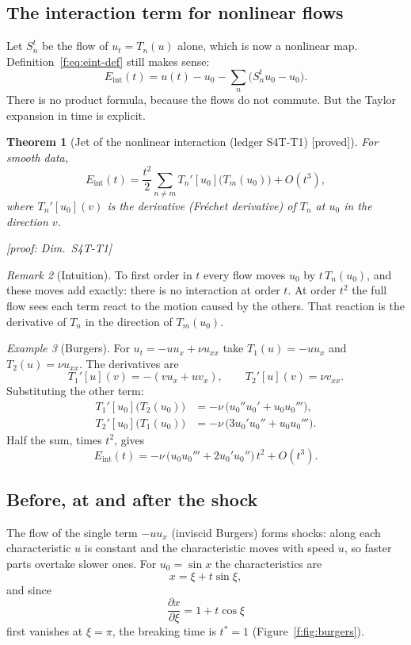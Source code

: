\documentclass[11pt]{article}
\theoremstyle{plain}
\newtheorem{theorem}{Theorem}[section]
\theoremstyle{definition}
\theoremstyle{remark}
\newtheorem{remark}[theorem]{Remark}
\newtheorem{example}[theorem]{Example}
\newcommand{\Eint}{E_{\mathrm{int}}}        %
\newcommand{\badge}[2]{\textcolor{#1}{\textsf{\footnotesize[#2]}}}
\newcommand{\proved}[1][]{\badge{cC}{proved#1}}
\newcommand{\led}[1]{\textcolor{cG}{\textsf{\footnotesize(ledger #1)}}}
\newenvironment{intuition}{\begin{remark}[Intuition]}{\end{remark}}
\newcommand{\dimref}[1]{\textsf{\footnotesize[proof: Dim.~#1]}}
\begin{document}
\subsection{The interaction term for nonlinear flows}

Let $S_n^t$ be the flow of $u_t=T_n(u)$ alone, which is now a nonlinear map. Definition~\eqref{f:eq:eint-def} still makes sense:
\[
\Eint(t)=u(t)-u_0-\sum_n\big(S_n^tu_0-u_0\big).
\]
There is no product formula, because the flows do not commute. But the Taylor expansion in time is explicit.

\begin{theorem}[{Jet of the nonlinear interaction \led{S4T-T1} \proved}]\label{f:thm:jet}
For smooth data,
\[
\Eint(t)=\frac{t^2}{2}\sum_{n\ne m}T_n'[u_0]\big(T_m(u_0)\big)+O(t^3),
\]
where $T_n'[u_0](v)$ is the derivative (Fr\'echet derivative) of $T_n$ at $u_0$ in the direction $v$.

\dimref{S4T-T1}
\end{theorem}

\begin{intuition}
To first order in $t$ every flow moves $u_0$ by $t\,T_n(u_0)$, and these moves add exactly: there is no interaction at order $t$. At order $t^2$ the full flow sees each term react to the motion caused by the others. That reaction is the derivative of $T_n$ in the direction of $T_m(u_0)$.
\end{intuition}

\begin{example}[{Burgers}]\label{f:ex:burgers-jet}
For $u_t=-uu_x+\nu u_{xx}$ take $T_1(u)=-uu_x$ and $T_2(u)=\nu u_{xx}$. The derivatives are
\[
T_1'[u](v)=-(vu_x+uv_x),\qquad T_2'[u](v)=\nu v_{xx}.
\]
Substituting the other term:
\begin{align*}
T_1'[u_0]\big(T_2(u_0)\big)&=-\nu\,\big(u_0''u_0'+u_0u_0'''\big),\\
T_2'[u_0]\big(T_1(u_0)\big)&=-\nu\,\big(3u_0'u_0''+u_0u_0'''\big).
\end{align*}
Half the sum, times $t^2$, gives
\[
\Eint(t)=-\nu\,\big(u_0u_0'''+2u_0'u_0''\big)\,t^2+O(t^3).
\]
\end{example}

\subsection{Before, at and after the shock}

The flow of the single term $-uu_x$ (inviscid Burgers) forms shocks: along each characteristic $u$ is constant and the characteristic moves with speed $u$, so faster parts overtake slower ones. For $u_0=\sin x$ the characteristics are
\[
x=\xi+t\sin\xi,
\]
and since
\[
\frac{\partial x}{\partial\xi}=1+t\cos\xi
\]
first vanishes at $\xi=\pi$, the breaking time is $t^*=1$ (Figure~\ref{f:fig:burgers}).
\end{document}
